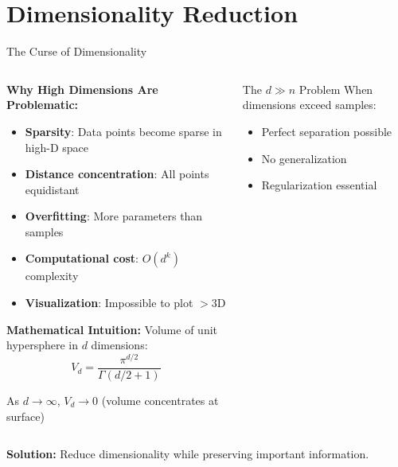 \documentclass[aspectratio=169,11pt]{beamer}
\begin{document}
\section{Dimensionality Reduction}

\begin{frame}{The Curse of Dimensionality}
\begin{columns}
\begin{column}{0.5\textwidth}
\textbf{Why High Dimensions Are Problematic:}

\begin{itemize}
\item \textbf{Sparsity}: Data points become sparse in high-D space
\item \textbf{Distance concentration}: All points equidistant
\item \textbf{Overfitting}: More parameters than samples
\item \textbf{Computational cost}: $O(d^k)$ complexity
\item \textbf{Visualization}: Impossible to plot $>3$D
\end{itemize}

\vspace{0.3cm}
\textbf{Mathematical Intuition:}
Volume of unit hypersphere in $d$ dimensions:
\[V_d = \frac{\pi^{d/2}}{\Gamma(d/2 + 1)}\]

As $d \to \infty$, $V_d \to 0$ (volume concentrates at surface)
\end{column}
\begin{column}{0.5\textwidth}
\begin{figure}
\centering
{}
\end{figure}

\begin{alertblock}{The $d \gg n$ Problem}
When dimensions exceed samples:
\begin{itemize}
\item Perfect separation possible
\item No generalization
\item Regularization essential
\end{itemize}
\end{alertblock}
\end{column}
\end{columns}

\textbf{Solution:} Reduce dimensionality while preserving important information.
\end{frame}
\end{document}
